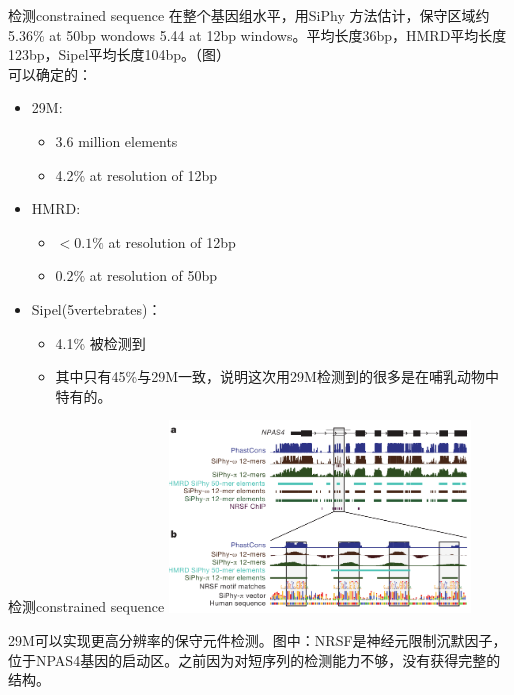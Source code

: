 \documentclass{beamer}
\begin{document}
\begin{frame}{检测constrained sequence}
在整个基因组水平，用SiPhy 方法估计，保守区域约5.36\% at 50bp wondows 5.44 at 12bp windows。平均长度36bp，HMRD平均长度123bp，Sipel平均长度104bp。（图）\\
可以确定的：								
\begin{itemize}
\item 29M:
	\begin{itemize}
	\item 3.6 million elements
	\item 4.2\% at resolution of 12bp 
	\end{itemize}
\item HMRD:
	\begin{itemize}
	\item $<0.1\%$ at resolution of 12bp
	\item  $0.2\%$ at resolution of 50bp
	\end{itemize}
\item Sipel(5vertebrates)：
	\begin{itemize}
	\item 4.1\% 被检测到
 	\item 其中只有45\%与29M一致，说明这次用29M检测到的很多是在哺乳动物中特有的。
	\end{itemize}
\end{itemize}	
\end{frame}

\begin{frame}{检测constrained sequence}
\includegraphics[width=8cm]{../NPAS4_example.png}

29M可以实现更高分辨率的保守元件检测。图中：NRSF是神经元限制沉默因子，位于NPAS4基因的启动区。之前因为对短序列的检测能力不够，没有获得完整的结构。
\end{frame}
\end{document}
